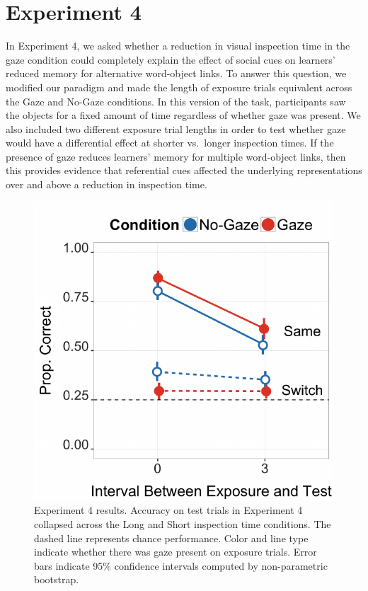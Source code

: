 \documentclass[authoryear, review]{elsarticle}
\newenvironment{CodeChunk}{}{}
\begin{document}
\section{Experiment 4}\label{experiment-4}

In Experiment 4, we asked whether a reduction in visual inspection time
in the gaze condition could completely explain the effect of social cues
on learners' reduced memory for alternative word-object links. To answer
this question, we modified our paradigm and made the length of exposure
trials equivalent across the Gaze and No-Gaze conditions. In this
version of the task, participants saw the objects for a fixed amount of
time regardless of whether gaze was present. We also included two
different exposure trial lengths in order to test whether gaze would
have a differential effect at shorter vs.~longer inspection times. If
the presence of gaze reduces learners' memory for multiple word-object
links, then this provides evidence that referential cues affected the
underlying representations over and above a reduction in inspection
time.

\begin{CodeChunk}
\begin{figure}[tb]

{\centering \includegraphics[width=0.5\linewidth]{figs/expt4-plot-1} 

}

\caption[Experiment 4 results]{Experiment 4 results. Accuracy on test trials in Experiment 4 collapsed across the Long and Short inspection time conditions. The dashed line represents chance performance. Color and line type indicate whether there was gaze present on exposure trials. Error bars indicate 95\% confidence intervals computed by non-parametric bootstrap. }\label{fig:expt4-plot}
\end{figure}
\end{CodeChunk}
\end{document}
